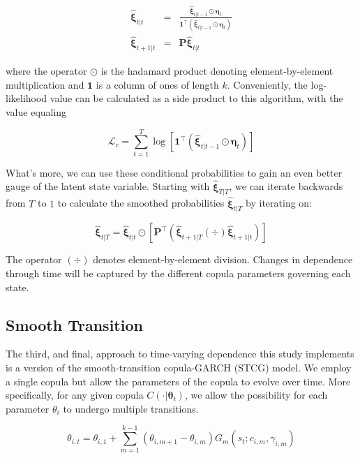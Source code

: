 \documentclass[12pt]{article}
\newcommand{\Lagr}{\mathcal{L}}
\newcommand{\boldXi}{\hat{\boldsymbol{\xi}}}
\begin{document}
\begin{eqnarray}
	\boldXi_{t|t} &=& \frac{\boldXi_{t|t-1}\odot\boldsymbol{\eta}_{t}}{\mathbf{1}^{\top}\left(\boldXi_{t|t-1}\odot \boldsymbol{\eta}_{t}\right)} \\
	\boldXi_{t+1|t} &=& \mathbf{P} \boldXi_{t|t}
\end{eqnarray}

where the operator $\odot$ is the hadamard product denoting element-by-element multiplication and $\mathbf{1}$ is a column of ones of length $k$. Conveniently, the log-likelihood value can be calculated as a side product to this algorithm, with the value equaling

\begin{equation}
\Lagr_{c} = \sum_{t=1}^{T}\log \left[\mathbf{1}^{\top}\left(\boldXi_{t|t-1} \odot \boldsymbol{\eta}_{t}\right)\right] 
\end{equation}

What's more, we can use these conditional probabilities to gain an even better gauge of the latent state variable. Starting with $\boldXi_{T|T}$, we can iterate backwards from $T$ to $1$ to calculate the smoothed probabilities $\boldXi_{t|T}$ by iterating on:

\begin{equation} \label{eqn:Kim_smooth_probability}
	\boldXi_{t|T} = \boldXi_{t|t} \odot \left[\mathbf{P}^{\top}\left(\boldXi_{t+1|T}\left(\div\right)\boldXi_{t+1|t}\right)\right]
\end{equation}

The operator $\left(\div\right)$ denotes element-by-element division. Changes in dependence through time will be captured by the different copula parameters governing each state.

\subsection{Smooth Transition}

The third, and final, approach to time-varying dependence this study implements is a version of the smooth-transition copula-GARCH (STCG) model. We employ a single copula but allow the parameters of the copula to evolve over time. More specifically, for any given copula $C\left(\cdot | \mathbf{\theta}_{t}\right)$, we allow the possibility for each parameter $\theta_{i}$ to undergo multiple transitions.

\begin{equation} \label{eqn:smoothTrans}
	\theta_{i,t} = \theta_{i,1} + \sum_{m=1}^{k-1}\left(\theta_{i,m+1} - \theta_{i,m}\right) G_{m}\left(s_{t}; c_{i,m},\gamma_{i,m}\right)
\end{equation}
\end{document}
